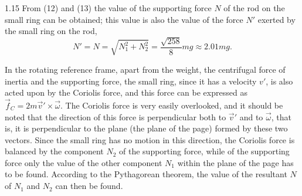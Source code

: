 \begin{solution}{1.15}
From (12) and (13) the value of the supporting force $N$ of the rod on the small ring can be obtained; this value is also the value of the force $N'$ exerted by the small ring on the rod,
\[
N'=N=\sqrt{N_1^2+N_2^2}=\frac{\sqrt{258}}{8}mg\approx2.01mg.
\]

\begin{commentary}
In the rotating reference frame, apart from the weight, the centrifugal force of inertia and the supporting force, the small ring, since it has a velocity $v'$, is also acted upon by the Coriolis force, and this force can be expressed as $\vec{f}_C=2m\vec{v}'\times\vec{\omega}$. The Coriolis force is very easily overlooked, and it should be noted that the direction of this force is perpendicular both to $\vec{v}'$ and to $\vec{\omega}$, that is, it is perpendicular to the plane (the plane of the page) formed by these two vectors. Since the small ring has no motion in this direction, the Coriolis force is balanced by the component $N_2$ of the supporting force, while of the supporting force only the value of the other component $N_1$ within the plane of the page has to be found. According to the Pythagorean theorem, the value of the resultant $N$ of $N_1$ and $N_2$ can then be found.
\end{commentary}
\end{solution}

